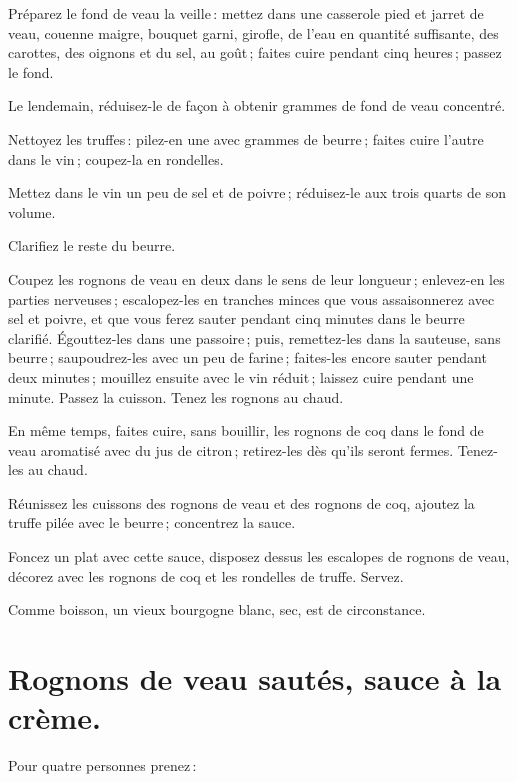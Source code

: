 \medskip

Préparez le fond de veau la veille : mettez dans une casserole pied et jarret
de veau, couenne maigre, bouquet garni, girofle, de l'eau en quantité
suffisante, des carottes, des oignons et du sel, au goût ; faites cuire pendant
cinq heures ; passez le fond.

Le lendemain, réduisez-le de façon à obtenir {\mmm} grammes de fond de veau
concentré.

Nettoyez les truffes : pilez-en une avec {\mmm} grammes de beurre ; faites cuire
l'autre dans le vin ; coupez-la en rondelles.

Mettez dans le vin un peu de sel et de poivre ; réduisez-le aux trois quarts de
son volume.

Clarifiez le reste du beurre.

Coupez les rognons de veau en deux dans le sens de leur longueur ; enlevez-en
les parties nerveuses ; escalopez-les en tranches minces que vous assaisonnerez
avec sel et poivre, et que vous ferez sauter pendant cinq minutes dans le
beurre clarifié. Égouttez-les dans une passoire ; puis, remettez-les dans la
sauteuse, sans beurre ; saupoudrez-les avec un peu de farine ; faites-les
encore sauter pendant deux minutes ; mouillez ensuite avec le vin réduit ;
laissez cuire pendant une minute. Passez la cuisson. Tenez les rognons au
chaud.

En même temps, faites cuire, sans bouillir, les rognons de coq dans le fond de
veau aromatisé avec du jus de citron ; retirez-les dès qu'ils seront fermes.
Tenez-les au chaud.

Réunissez les cuissons des rognons de veau et des rognons de coq, ajoutez la
truffe pilée avec le beurre ; concentrez la sauce.

Foncez un plat avec cette sauce, disposez dessus les escalopes de rognons de
veau, décorez avec les rognons de coq et les rondelles de truffe. Servez.

Comme boisson, un vieux bourgogne blanc, sec, est de circonstance.

\section*{\centering Rognons de veau sautés, sauce à la crème.}
{}

Pour quatre personnes prenez :

